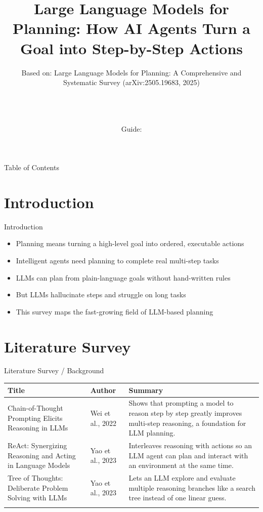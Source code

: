 \documentclass[10pt]{beamer}
\title[B.Tech Seminar]{Large Language Models for Planning: How AI Agents Turn a Goal into Step-by-Step Actions}
\subtitle{Based on: Large Language Models for Planning: A Comprehensive and Systematic Survey (arXiv:2505.19683, 2025)}
\author[\studentname\ (\shortinst)]{\studentname \\ \small \rollno \\ \small \rollclass \\ \small Guide: \guidename}
\institute[]{\deptname \\ \collegename}
\date{\seminardate}
\begin{document}
\begin{frame}[plain]
  \titlepage
\end{frame}

\begin{frame}{Table of Contents}
  \tableofcontents
\end{frame}

\section{Introduction}
\begin{frame}{Introduction}
\begin{itemize}
  \item Planning means turning a high-level goal into ordered, executable actions
  \item Intelligent agents need planning to complete real multi-step tasks
  \item LLMs can plan from plain-language goals without hand-written rules
  \item But LLMs hallucinate steps and struggle on long tasks
  \item This survey maps the fast-growing field of LLM-based planning
\end{itemize}
\end{frame}

\section{Literature Survey}
\begin{frame}{Literature Survey / Background}
  \small
  \begin{tabular}{@{}p{2.7cm}p{2.3cm}p{5.6cm}@{}}
    \toprule
    \textbf{Title} & \textbf{Author} & \textbf{Summary} \\
    \midrule
    Chain-of-Thought Prompting Elicits Reasoning in LLMs & Wei et al., 2022 & Shows that prompting a model to reason step by step greatly improves multi-step reasoning, a foundation for LLM planning. \\
    \addlinespace
    ReAct: Synergizing Reasoning and Acting in Language Models & Yao et al., 2023 & Interleaves reasoning with actions so an LLM agent can plan and interact with an environment at the same time. \\
    \addlinespace
    Tree of Thoughts: Deliberate Problem Solving with LLMs & Yao et al., 2023 & Lets an LLM explore and evaluate multiple reasoning branches like a search tree instead of one linear guess. \\
    \addlinespace
    \bottomrule
  \end{tabular}
\end{frame}
\end{document}
